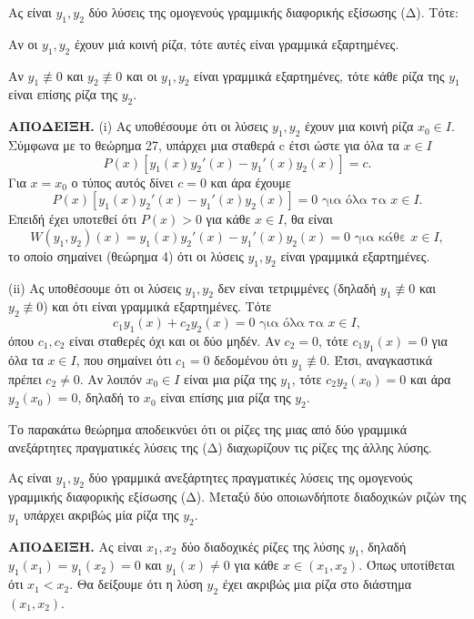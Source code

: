 \documentclass[11pt,a4paper,twoside]{book}
\newcommand{\titlefont}[1]{{\fontfamily{maksf}\selectfont #1}}
\newcounter{thewrhma}[chapter]
\renewcommand{\thethewrhma}{\thechapter.\arabic{thewrhma}}
\newcommand{\thewr}{\refstepcounter{thewrhma}{\bf\titlefont{\textcolor{secondarycolor}{\large Θεώρημα\hspace{2mm}\thethewrhma}}}\hspace{1mm}}{}
\newenvironment{Thewrhma}[1]
{\begin{tcolorbox}[title=\thewr\ \ :\ \  {\textcolor{black}{\bf{\large\titlefont{#1}}}},
breakable,
enhanced standard,
titlerule=-.2pt,
toprule=0pt, 
rightrule=0pt, 
bottomrule=0pt,
colback=white,
left=2mm,
top=1mm,
bottom=0mm,
boxrule=0pt,
colframe=white,
borderline west={1.5mm}{0pt}{secondarycolor},
leftrule=2mm,
sharp corners,
coltitle=secondarycolor]}
{\end{tcolorbox}}
\newcommand{\eng}[1]{\selectlanguage{english}#1\selectlanguage{greek}}
\begin{document}
\begin{Thewrhma}{28}
Ας είναι $y_1, y_2$ δύο λύσεις της ομογενούς γραμμικής διαφορικής εξίσωσης (Δ). Τότε:
    \begin{rlist}
        \item Αν οι $y_1, y_2$ έχουν μιά κοινή ρίζα, τότε αυτές είναι γραμμικά εξαρτημένες.
        \item Αν $y_1 \not\equiv 0$ και $y_2 \not\equiv 0$ και οι $y_1, y_2$ είναι γραμμικά εξαρτημένες, τότε κάθε ρίζα της $y_1$ είναι επίσης ρίζα της $y_2$.
    \end{rlist}
\end{Thewrhma}

\noindent\textbf{ΑΠΟΔΕΙΞΗ.} (i) Ας υποθέσουμε ότι οι λύσεις $y_1, y_2$ έχουν μια κοινή ρίζα $x_0 \in I$. Σύμφωνα με το θεώρημα 27, υπάρχει μια σταθερά c έτσι ώστε για όλα τα $x \in I$
\[ P(x)[y_1(x)y_2'(x)-y_1'(x)y_2(x)]=c. \]
Για $x=x_0$ ο τύπος αυτός δίνει $c=0$ και άρα έχουμε
\[ P(x)[y_1(x)y_2'(x)-y_1'(x)y_2(x)]=0 \text{ για όλα τα } x \in I. \]
Επειδή έχει υποτεθεί ότι $P(x)>0$ για κάθε $x \in I$, θα είναι
\[ W(y_1,y_2)(x)=y_1(x)y_2'(x)-y_1'(x)y_2(x)=0 \text{ για κάθε } x \in I, \]
το οποίο σημαίνει (θεώρημα 4) ότι οι λύσεις $y_1, y_2$ είναι γραμμικά εξαρτημένες.

(ii) Ας υποθέσουμε ότι οι λύσεις $y_1, y_2$ δεν είναι τετριμμένες (δηλαδή $y_1 \not\equiv 0$ και $y_2 \not\equiv 0$) και ότι είναι γραμμικά εξαρτημένες. Τότε
\[ c_1y_1(x)+c_2y_2(x)=0 \text{ για όλα τα } x \in I, \]
όπου $c_1, c_2$ είναι σταθερές όχι και οι δύο μηδέν. Αν $c_2=0$, τότε $c_1y_1(x)=0$ για όλα τα $x \in I$, που σημαίνει ότι $c_1=0$ δεδομένου ότι $y_1 \not\equiv 0$. Έτσι, αναγκαστικά πρέπει $c_2 \neq 0$. Αν λοιπόν $x_0 \in I$ είναι μια ρίζα της $y_1$, τότε $c_2y_2(x_0)=0$ και άρα $y_2(x_0)=0$, δηλαδή το $x_0$ είναι επίσης μια ρίζα της $y_2$.

Το παρακάτω θεώρημα αποδεικνύει ότι οι ρίζες της μιας από δύο γραμμικά ανεξάρτητες πραγματικές λύσεις της (Δ) διαχωρίζουν τις ρίζες της άλλης λύσης.

\begin{Thewrhma}{29 (Θεώρημα διαχωρισμού του \eng)}
Ας είναι $y_1, y_2$ δύο γραμμικά ανεξάρτητες πραγματικές λύσεις της ομογενούς γραμμικής διαφορικής εξίσωσης (Δ). Μεταξύ δύο οποιωνδήποτε διαδοχικών ριζών της $y_1$ υπάρχει ακριβώς μία ρίζα της $y_2$.
\end{Thewrhma}
\noindent\textbf{ΑΠΟΔΕΙΞΗ.} Ας είναι $x_1, x_2$ δύο διαδοχικές ρίζες της λύσης $y_1$, δηλαδή $y_1(x_1)=y_1(x_2)=0$ και $y_1(x)\neq 0$ για κάθε $x \in (x_1,x_2)$. Όπως υποτίθεται ότι $x_1<x_2$. Θα δείξουμε ότι η λύση $y_2$ έχει ακριβώς μια ρίζα στο διάστημα $(x_1,x_2)$.
\end{document}
